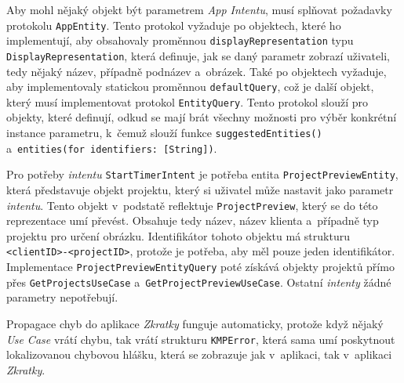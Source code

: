 Aby mohl nějaký objekt být parametrem \emph{App Intentu}, musí splňovat požadavky protokolu \texttt{AppEntity}. Tento protokol vyžaduje po objektech, které ho implementují, aby obsahovaly proměnnou \texttt{displayRepresentation} typu \texttt{DisplayRepresentation}, která definuje, jak se daný parametr zobrazí uživateli, tedy nějaký název, případně podnázev a~obrázek. Také po objektech vyžaduje, aby implementovaly statickou proměnnou \texttt{defaultQuery}, což je další objekt, který musí implementovat protokol \texttt{EntityQuery}. Tento protokol slouží pro objekty, které definují, odkud se mají brát všechny možnosti pro výběr konkrétní instance parametru, k~čemuž slouží funkce \texttt{suggestedEntities()} a~\texttt{entities(for identifiers: [String])}.

Pro potřeby \emph{intentu} \texttt{StartTimerIntent} je potřeba entita \texttt{ProjectPreviewEntity}, která představuje objekt projektu, který si uživatel může nastavit jako parametr \emph{intentu}. Tento objekt v~podstatě reflektuje \texttt{ProjectPreview}, který se do této reprezentace umí převést. Obsahuje tedy název, název klienta a~případně typ projektu pro určení obrázku. Identifikátor tohoto objektu má strukturu \texttt{<clientID>-<projectID>}, protože je potřeba, aby měl pouze jeden identifikátor. Implementace \texttt{ProjectPreviewEntityQuery} poté získává objekty projektů přímo přes \texttt{GetProjectsUseCase} a~\texttt{GetProjectPreviewUseCase}. Ostatní \emph{intenty} žádné parametry nepotřebují.

Propagace chyb do aplikace \emph{Zkratky} funguje automaticky, protože když nějaký \emph{Use Case} vrátí chybu, tak vrátí strukturu \texttt{KMPError}, která sama umí poskytnout lokalizovanou chybovou hlášku, která se zobrazuje jak v~aplikaci, tak v~aplikaci \emph{Zkratky}.
































